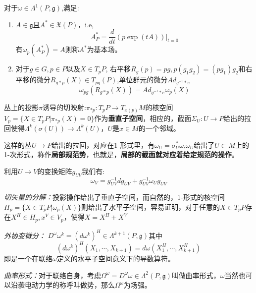 \documentclass[supercite]{HustGraduPaper}
\begin{document}
\begin{appendices}
		对于$\omega \in \Lambda^1(P,\mathfrak{g})$,满足:
		\begin{enumerate}
			\item $A \in \mathfrak{g}$且$A^* \in \mathfrak{X}(P)$，i.e, 
			\begin{equation}
			A^*_P = \frac{d}{dt}(p \exp(tA))|_{t= 0}
			\end{equation}
			有$\omega_p(A^*_P) = A$则称$A^*$为基本场。
			\item 对于$g \in G, p \in P$以及$X \in T_p P$, 右平移$R_g(p) = pg, p(g_1g_2) = (pg_1)g_2$和右平移的微分$R_{g * p}(X)\in T_{pg}(P)$,单位群元的微分$Ad_{g^{-1}*e}$
			\begin{equation}
			\omega_{pg}(R_{g*p}(X) ) = Ad_{g^{-1}*e} \omega_p(X)
			\end{equation}
		\end{enumerate}
	
		
		
		丛上的投影$\pi$诱导的切映射:$\pi_{*p}: T_p P \to T_{x(p)}M$的核空间$V_p = \{X\in T_pP | \pi_{*p}(X) = 0\}$作为\textbf{垂直子空间}，相应的，截面$\Sigma_U: U \to P$给出的拉回使得$\Lambda^k(\sigma(U)) \to \Lambda^k(U)$，$U$是$x \in M$的一个邻域。
		
		这样的丛$U \to P$给出的拉回，对应在1-形式里，有$\omega_U = \sigma^*_U \omega$,$\omega_U$给出了$U \subset M$上的1-次形式，称作\textbf{局部规范势}，也就是，\textbf{局部的截面就对应着给定规范的操作}。
		
		利用$U \to V$的变换矩阵$g_{UV}$我们有:
		\begin{equation}
		\omega_V = g_{UV}^{-1} dg_{UV} + g_{UV}^{-1}\omega_U g_{UV}
		\end{equation}
		
		\textit{切矢量的分解：}投影操作给出了垂直子空间，而自然的，1-形式的核空间$H_p = \{X\in T_p P |\omega_p(X) \}$则给出了水平子空间，容易证明，对于任意的$X \in T_pP$存在$X^H \in H_p,x^V \in V_p$，使得$X= X^H + X^V$
		
		\textit{外协变微分：} $D^\omega \omega^k = (d\omega^k)^H \in \Lambda^{k+1}(P,\mathfrak{g})$其中
		\begin{equation}
		(d\omega^k)^H(X_1,\cdots,X_{k+1}) = d\omega(X_1^H,\cdots,X_{k+1}^H)
		\end{equation}
		即是一个在联络$\omega$定义的水平子空间意义下的导数算符。
		
		\textit{曲率形式：}对于联络自身，考虑$\Omega^\omega = D^\omega \omega \in \Lambda^2(P,\mathfrak{g})$叫做曲率形式，$\omega$当然也可以沿袭电动力学的称呼叫做势，那么$\Omega^\omega$为场强。
		

\end{appendices}
\end{document}
